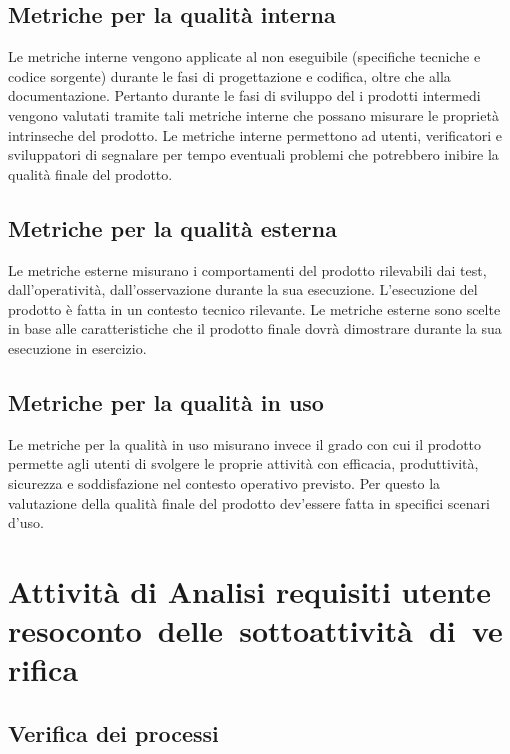 \documentclass[a4paper, titlepage]{article}
\begin{document}
\subsection{Metriche per la qualità interna}
Le metriche interne vengono applicate al  non eseguibile (specifiche tecniche e codice sorgente) durante le fasi di progettazione e codifica, oltre che alla documentazione. Pertanto durante le fasi di sviluppo del  i prodotti intermedi vengono valutati tramite tali metriche interne che possano misurare le proprietà intrinseche del prodotto.
\newline Le metriche interne permettono ad utenti, verificatori e sviluppatori di segnalare per tempo eventuali problemi che potrebbero inibire la qualità finale del prodotto.

\subsection{Metriche per la qualità esterna}
Le metriche esterne misurano i comportamenti del prodotto  rilevabili dai test, dall'operatività, dall'osservazione durante la sua esecuzione. L’esecuzione del prodotto  è fatta in un contesto tecnico rilevante.
\newline Le metriche esterne sono scelte in base alle caratteristiche che il prodotto finale dovrà dimostrare durante la sua esecuzione in esercizio.

\subsection{Metriche per la qualità in uso}
Le metriche per la qualità in uso misurano invece il grado con cui il prodotto  permette agli utenti di svolgere le proprie attività con efficacia, produttività, sicurezza e soddisfazione nel contesto operativo previsto. Per questo la valutazione della qualità finale del prodotto  dev'essere fatta in specifici scenari d'uso.

\newpage
\section{Attività di Analisi requisiti utente \\\large{resoconto~delle~sottoattività~di~verifica}}
\label{app:valtest}

\subsection{Verifica dei processi}
\end{document}
